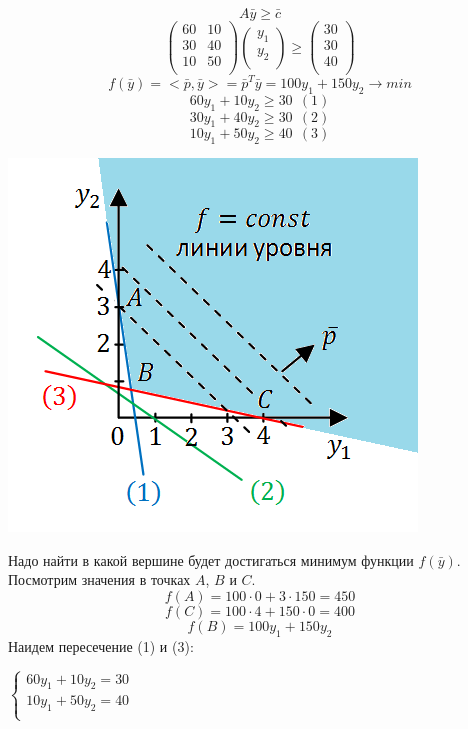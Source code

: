 \documentclass[12pt]{article}
\theoremstyle{definition}
\numberwithin{equation}{section}
\begin{document}
$$A\bar y \geqslant \bar c$$
\[\begin{pmatrix}
60 & 10\\
30 & 40\\
10 & 50\\
\end{pmatrix}\begin{pmatrix}
y_1\\
y_2\\
\end{pmatrix} \geqslant \begin{pmatrix}
30\\
30\\
40\\
\end{pmatrix}\]
$$f(\bar y)=<\bar p, \bar y>=\bar p^T\bar y=100y_1+150y_2 \to min$$
$$60y_1+10y_2 \geqslant 30~~(1)$$
$$30y_1+40y_2 \geqslant 30~~(2)$$
$$10y_1+50y_2 \geqslant 40~~(3)$$
\begin{center}
\includegraphics[scale=0.8]{l18_2.png}\\
\end{center}
Надо найти в какой вершине будет достигаться минимум функции $f(\bar y)$. Посмотрим значения в точках $A$, $B$ и $C$.\\
$$f(A)=100\cdot 0+3\cdot 150=450$$
$$f(C)=100\cdot 4+150 \cdot 0=400$$
$$f(B)=100y_1+150y_2$$
Наидем пересечение (1) и (3):
\begin{center}
$
\left\{
\begin{array}{lcl}
   60y_1+10y_2=30\\
   10y_1+50y_2=40\\
\end{array}
\right.
$
\end{center}
\end{document}
